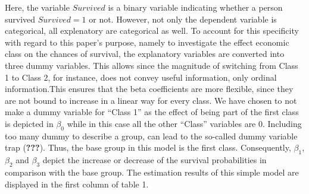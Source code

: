 \documentclass[
]{article}
\begin{document}
Here, the variable \(Survived\) is a binary variable indicating whether
a person survived \(Survived = 1\) or not. However, not only the
dependent variable is categorical, all explenatory are categorical as
well. To account for this specificity with regard to this paper's
purpose, namely to investigate the effect economic class on the chances
of survival, the explanatory variables are converted into three dummy
variables. This allows since the magnitude of switching from Class 1 to
Class 2, for instance, does not convey useful information, only ordinal
information.This ensures that the beta coefficients are more flexible,
since they are not bound to increase in a linear way for every class. We
have chosen to not make a dummy variable for ``Class 1'' as the effect
of being part of the first class is depicted in \(\beta_0\) while in
this case all the other ``Class'' variables are 0. Including too many
dummy to describe a group, can lead to the so-called dummy variable trap
({\textbf{???}}). Thus, the base group in this model is the first class.
Consequently, \(\beta_1\), \(\beta_2\) and \(\beta_3\) depict the
increase or decrease of the survival probabilities in comparison with
the base group. The estimation results of this simple model are
displayed in the first column of table 1.
\end{document}
